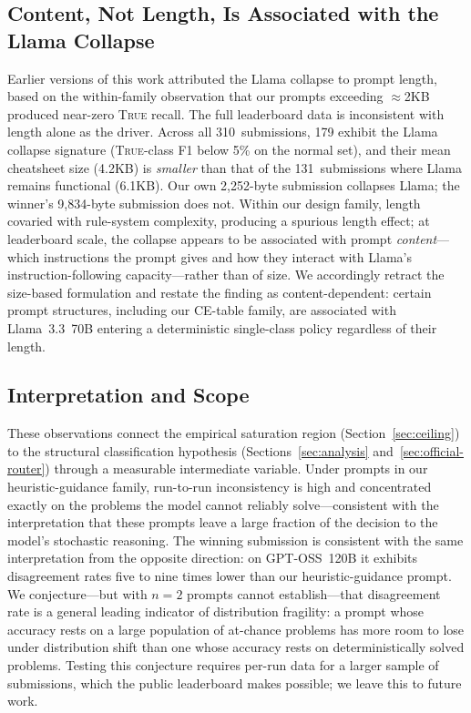 \documentclass[11pt]{article}
\begin{document}
\subsection{Content, Not Length, Is Associated with the Llama Collapse}
\label{sec:instability-llama}

Earlier versions of this work attributed the Llama collapse to prompt
length, based on the within-family observation that our prompts
exceeding $\approx$2KB produced near-zero \textsc{True} recall. The
full leaderboard data is inconsistent with length alone as the driver. Across all
310~submissions, 179 exhibit the Llama collapse signature
(\textsc{True}-class F1 below 5\% on the normal set), and their mean
cheatsheet size (4.2KB) is \emph{smaller} than that of the
131~submissions where Llama remains functional (6.1KB). Our own
2{,}252-byte submission collapses Llama; the winner's 9{,}834-byte
submission does not. Within our design family, length covaried with
rule-system complexity, producing a spurious length effect; at
leaderboard scale, the collapse appears to be associated with prompt
\emph{content}---which instructions the prompt gives and how they
interact with Llama's instruction-following capacity---rather than of
size. We accordingly retract the size-based formulation and restate
the finding as content-dependent: certain prompt structures, including
our CE-table family, are associated with Llama~3.3~70B entering a
deterministic single-class policy regardless of their length.

\subsection{Interpretation and Scope}
\label{sec:instability-interp}

These observations connect the empirical saturation region
(Section~\ref{sec:ceiling}) to the structural classification
hypothesis (Sections~\ref{sec:analysis}
and~\ref{sec:official-router}) through a measurable intermediate
variable. Under prompts in our heuristic-guidance family, run-to-run
inconsistency is high and concentrated exactly on the problems the
model cannot reliably solve---consistent with the interpretation that
these prompts leave a large fraction of the decision to the model's
stochastic reasoning. The winning submission is consistent with the
same interpretation from the opposite direction: on GPT-OSS~120B it
exhibits disagreement rates five to nine times lower than our
heuristic-guidance prompt. We conjecture---but with $n{=}2$ prompts
cannot establish---that disagreement rate is a general leading
indicator of distribution fragility: a prompt whose accuracy rests on
a large population of at-chance problems has more room to lose under
distribution shift than one whose accuracy rests on deterministically
solved problems. Testing this conjecture requires per-run data for a
larger sample of submissions, which the public leaderboard makes
possible; we leave this to future work.
\end{document}
